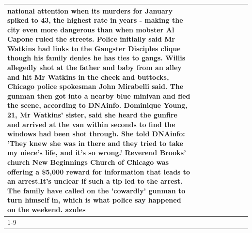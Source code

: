 \begin{table}[H]
\begin{tabular}{lllrlllll}
national attention when its murders for January spiked to 43, the highest rate in years - making the city even more dangerous than when mobster Al Capone ruled the streets. Police initially said Mr Watkins had links to the Gangster Disciples clique though his family denies he has ties to gangs. Willis allegedly shot at the father and baby from an alley and hit Mr Watkins in the cheek and buttocks, Chicago police spokesman John Mirabelli said. The gunman then got into a nearby blue minivan and fled the scene, according to DNAinfo. Dominique Young, 21, Mr Watkins' sister, said she heard the gunfire and arrived at the van within seconds to find the windows had been shot through. She told DNAinfo: 'They knew she was in there and they tried to take my niece's life, and it's so wrong.' Reverend Brooks' church New Beginnings Church of Chicago was offering a \$5,000 reward for information that leads to an arrest.It's unclear if such a tip led to the arrest. The family have called on the 'cowardly' gunman to turn himself in, which is what police say happened on the weekend. azules \\
\cline{1-9}

\end{tabular}
\end{table}

